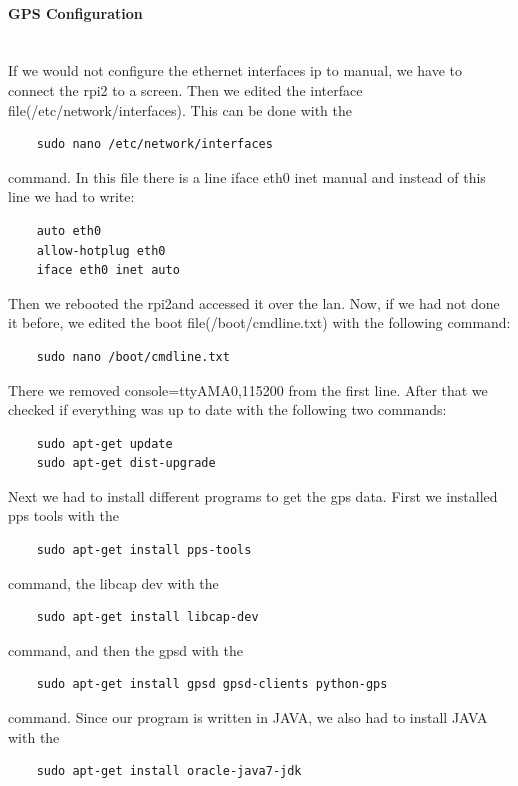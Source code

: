 \paragraph{GPS Configuration} \mbox{}\\
If we would not configure the ethernet interfaces \gls{ip} to manual, we have to connect the \gls{rpi2} to a screen. Then we edited the interface file(/etc/network/interfaces). This can be done with the 
\begin{verbatim}
	sudo nano /etc/network/interfaces
\end{verbatim}
command. \newline
In this file there is a line iface eth0 inet manual and instead of this line we had to write:
\begin{verbatim}
	auto eth0
	allow-hotplug eth0
	iface eth0 inet auto
\end{verbatim}
Then we rebooted the \gls{rpi2}and accessed it over the \gls{lan}. \newline
Now, if we had not done it before, we edited the boot file(/boot/cmdline.txt) with the following command:
\begin{verbatim}
	sudo nano /boot/cmdline.txt
\end{verbatim}
There we removed console=ttyAMA0,115200 from the first line.\newline
After that we checked if everything was up to date with the following two commands:
\begin{verbatim}
	sudo apt-get update
	sudo apt-get dist-upgrade
\end{verbatim}
Next we had to install different programs to get the \gls{gps} data.\newline
First we installed pps tools with the 
\begin{verbatim}
	sudo apt-get install pps-tools
\end{verbatim}
command, the libcap dev with the 
\begin{verbatim}
	sudo apt-get install libcap-dev
\end{verbatim}
command, and then the \gls{gpsd} with the 
\begin{verbatim}
	sudo apt-get install gpsd gpsd-clients python-gps
\end{verbatim}
command.\newline
Since our program is written in JAVA, we also had to install JAVA with the 
\begin{verbatim}
	sudo apt-get install oracle-java7-jdk
\end{verbatim}
